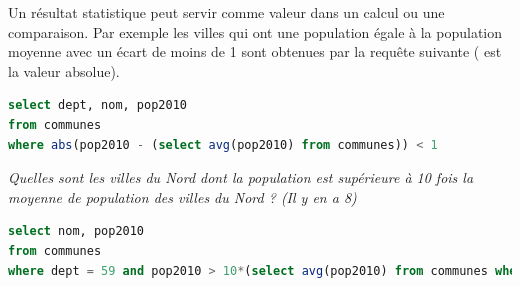 Un résultat statistique peut servir comme valeur dans un calcul ou une comparaison. Par exemple les villes qui ont une population égale à la population moyenne avec un écart de moins de 1 sont obtenues par la requête suivante ( est la valeur absolue).
\begin{lstlisting}[language=SQL]
select dept, nom, pop2010
from communes
where abs(pop2010 - (select avg(pop2010) from communes)) < 1
\end{lstlisting}
\begin{Exercise}\it 
Quelles sont les villes du Nord dont la population est supérieure à 10 fois la moyenne de population des villes du Nord ? (Il y en a 8)
\end{Exercise}
\begin{Answer}
\begin{lstlisting}[language=SQL]
select nom, pop2010
from communes
where dept = 59 and pop2010 > 10*(select avg(pop2010) from communes where dept = 59)\end{lstlisting}
\end{Answer}


